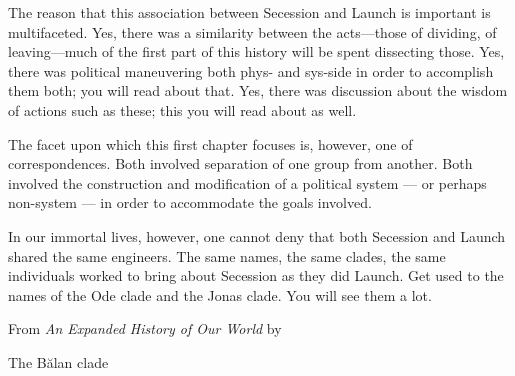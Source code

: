   The reason that this association between Secession and Launch is important is multifaceted. Yes, there was a similarity between the acts---those of dividing, of leaving---much of the first part of this history will be spent dissecting those. Yes, there was political maneuvering both phys- and sys-side in order to accomplish them both; you will read about that. Yes, there was discussion about the wisdom of actions such as these; this you will read about as well.

  The facet upon which this first chapter focuses is, however, one of correspondences. Both involved separation of one group from another. Both involved the construction and modification of a political system — or perhaps non-system — in order to accommodate the goals involved.

  In our immortal lives, however, one cannot deny that both Secession and Launch shared the same engineers. The same names, the same clades, the same individuals worked to bring about Secession as they did Launch. Get used to the names of the Ode clade and the Jonas clade. You will see them a lot.

  \vspace{1em}

  From \emph{An Expanded History of Our World} by

  The Bălan clade
  
  \vfill



















